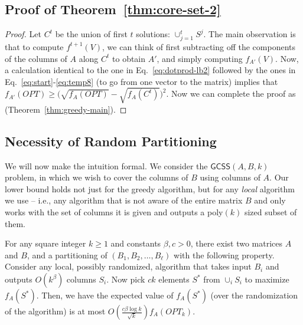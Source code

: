 \documentclass{article}
\newcommand{\E}{\mathbb{E}}
\newcommand{\opt}{OPT}
\newcommand{\gcss}{\textsf{GCSS}}
\begin{document}
\subsection{Proof of Theorem~\ref{thm:core-set-2}} \label{app:core-set-2}
\begin{proof}
  Let $C^t$ be the union of first $t$ solutions: $\cup_{j=1}^t S^{j}$. The main observation is that to compute $f^{t+1}(V)$, we can think of first subtracting off the components of the columns of $A$ along $C^t$ to obtain $A'$, and simply computing $f_{A'}(V)$. Now, a calculation identical to the one in Eq.~\eqref{eq:dotprod-lb2} followed by the ones in Eq.~\eqref{eq:start}-\eqref{eq:temp8} (to go from one vector to the matrix) implies that $f_{A'}(\opt) \ge \big( \sqrt{f_{A}(\opt)} - \sqrt{f_{A}(C^t)}\big)^2$.  Now we can complete the proof as (Theorem~\ref{thm:greedy-main}).
\iffalse
For any $t \geq 1$, we use $OPT$ as the benchmark, and note that $f^t(OPT) = f^t(OPT \cup A^{t-1}) \geq f(OPT)$. On the other hand, $f(\emptyset)$ is equal to $f(A^{t-1})$. So there is a gap of at least $f(OPT) - f(A^{t-1})$ to be exploited.  
Using Theorem~\ref{thm:core-set-1}, we know that in epoch $t$ we find a set $S^t$ with expected $\E[f^t(S^t)]$ at least $\Omega(\sigma_{min}(OPT) (f(OPT) - f(A^{t-1})))$. This can be rewritten as: 

$$
\E[f(A^t)] \geq (1-\sigma)\E[f(A^{t-1})] + \sigma f(OPT)
$$ 

where $\sigma$ is $\Omega(\sigma_{min}(OPT))$. By monotonicity of $f$ and induction, we can prove that $\E[f(A^t)]$ is at least $[1 - (1 - \Omega(\sigma_{min}(OPT)))^r] f(OPT)$ which completes the proof. 
\fi
\end{proof}

\subsection{Necessity of Random Partitioning} \label{app:rand-part}
We will now make the intuition formal. We consider the $\gcss(A, B, k)$ problem, in which we wish to cover the columns of $B$ using columns of $A$. Our lower bound holds not just for the greedy algorithm, but for any {\em local} algorithm we use -- i.e., any algorithm that is not aware of the entire matrix $B$ and only works with the set of columns it is given and outputs a poly$(k)$ sized subset of them.

\begin{thm} \label{thm:rand-part}
For any square integer $k \geq 1$ and constants $\beta, c >0$, there exist two matrices $A$ and $B$, and a partitioning of $(B_1, B_2, \dots, B_\ell)$ with the following property. Consider any local, possibly randomized, algorithm that takes input $B_i$ and outputs $O(k^{\beta})$ columns $S_i$.  Now pick $ck$ elements $S^*$ from $\cup_i S_i$ to maximize $f_A(S^*)$. Then, we have the expected value of $f_A (S^*)$ (over the randomization of the algorithm) is at most $O\left( \frac{c\beta \log k}{\sqrt{k}} \right) f_A(\opt_k)$.
\end{thm}
\end{document}
